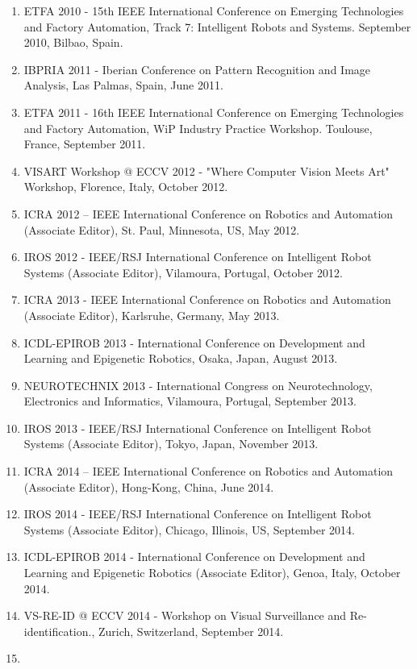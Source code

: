 \documentclass[
]{article}
\begin{document}
\begin{enumerate}
  Recognition, July 2010, Póvoa do Varzim, Portugal.
\item
  ETFA 2010 - 15th IEEE International Conference on Emerging
  Technologies and Factory Automation, Track 7: Intelligent Robots and
  Systems. September 2010, Bilbao, Spain.
\item
  IBPRIA 2011 - Iberian Conference on Pattern Recognition and Image
  Analysis, Las Palmas, Spain, June 2011.
\item
  ETFA 2011 - 16th IEEE International Conference on Emerging
  Technologies and Factory Automation, WiP Industry Practice Workshop.
  Toulouse, France, September 2011.
\item
  VISART Workshop @ ECCV 2012 - "Where Computer Vision Meets Art"
  Workshop, Florence, Italy, October 2012.
\item
  ICRA 2012 -- IEEE International Conference on Robotics and Automation
  (Associate Editor), St. Paul, Minnesota, US, May 2012.
\item
  IROS 2012 - IEEE/RSJ International Conference on Intelligent Robot
  Systems (Associate Editor), Vilamoura, Portugal, October 2012.
\item
  ICRA 2013 - IEEE International Conference on Robotics and Automation
  (Associate Editor), Karlsruhe, Germany, May 2013.
\item
  ICDL-EPIROB 2013 - International Conference on Development and
  Learning and Epigenetic Robotics, Osaka, Japan, August 2013.
\item
  NEUROTECHNIX 2013 - International Congress on Neurotechnology,
  Electronics and Informatics, Vilamoura, Portugal, September 2013.
\item
  IROS 2013 - IEEE/RSJ International Conference on Intelligent Robot
  Systems (Associate Editor), Tokyo, Japan, November 2013.
\item
  ICRA 2014 -- IEEE International Conference on Robotics and Automation
  (Associate Editor), Hong-Kong, China, June 2014.
\item
  IROS 2014 - IEEE/RSJ International Conference on Intelligent Robot
  Systems (Associate Editor), Chicago, Illinois, US, September 2014.
\item
  ICDL-EPIROB 2014 - International Conference on Development and
  Learning and Epigenetic Robotics (Associate Editor), Genoa, Italy,
  October 2014.
\item
  VS-RE-ID @ ECCV 2014 - Workshop on Visual Surveillance and
  Re-identification., Zurich, Switzerland, September 2014.
\item

\end{enumerate}
\end{document}
